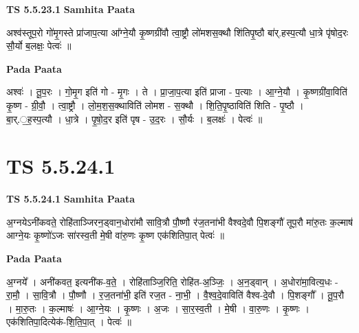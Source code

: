 \documentclass[17pt]{extarticle}
\begin{document}
\textbf{TS 5.5.23.1 } \newline
\textbf{Samhita Paata} \newline

अश्व॑स्तूप॒रो गो॑मृ॒गस्ते प्रा॑जाप॒त्या आ᳚ग्ने॒यौ कृ॒ष्णग्री॑वौ त्वा॒ष्ट्रौ लो॑मशस॒क्थौ शि॑तिपृ॒ष्ठौ बा॑र्.हस्प॒त्यौ धा॒त्रे पृ॑षोद॒रः सौ॒र्यो ब॒लक्षः॒ पेत्वः॑ ॥ \newline

\textbf{Pada Paata} \newline

अश्वः॑ । तू॒प॒रः । गो॒मृ॒ग इति॑ गो - मृ॒गः । ते । प्रा॒जा॒प॒त्या इति॑ प्राजा - प॒त्याः । आ॒ग्ने॒यौ । कृ॒ष्णग्री॑वा॒विति॑ कृ॒ष्ण - ग्री॒वौ॒ । त्वा॒ष्ट्रौ । लो॒म॒श॒स॒क्थाविति॑ लोमश - स॒क्थौ । शि॒ति॒पृ॒ष्ठाविति॑ शिति - पृ॒ष्ठौ । बा॒र्.॒ह॒स्प॒त्यौ । धा॒त्रे । पृ॒षो॒द॒र इति॑ पृष - उ॒द॒रः । सौ॒र्यः । ब॒लक्षः॑ । पेत्वः॑ ॥  \newline




\section*{ TS 5.5.24.1 }

\textbf{TS 5.5.24.1 } \newline
\textbf{Samhita Paata} \newline

अ॒ग्नयेऽनी॑कवते॒ रोहि॑ताञ्जिरन॒ड्वान॒धोरा॑मौ सावि॒त्रौ पौ॒ष्णौ र॑ज॒तना॑भी वैश्वदे॒वौ पि॒शङ्गौ॑ तूप॒रौ मा॑रु॒तः क॒ल्माष॑ आग्ने॒यः कृ॒ष्णो॑ऽजः सा॑रस्व॒ती मे॒षी वा॑रु॒णः कृ॒ष्ण एक॑शितिपा॒त् पेत्वः॑ ॥ \newline

\textbf{Pada Paata} \newline

अ॒ग्नये᳚ । अनी॑कवत॒ इत्यनी॑क-व॒ते॒ । रोहि॑ताञ्जि॒रिति॒ रोहि॑त-अ॒ञ्जिः॒ । अ॒न॒ड्वान् । अ॒धोरा॑मा॒वित्य॒धः - रा॒मौ॒ । सा॒वि॒त्रौ । पौ॒ष्णौ । र॒ज॒तना॑भी॒ इति॑ रज॒त - ना॒भी॒ । वै॒श्व॒दे॒वाविति॑ वैश्व-दे॒वौ । पि॒शङ्गौ᳚ । तू॒प॒रौ । मा॒रु॒तः । क॒ल्माषः॑ । आ॒ग्ने॒यः । कृ॒ष्णः । अ॒जः । सा॒र॒स्व॒ती । मे॒षी । वा॒रु॒णः । कृ॒ष्णः । एक॑शितिपा॒दित्येक॑-शि॒ति॒पा॒त् । पेत्वः॑ ॥  \newline
\end{document}
